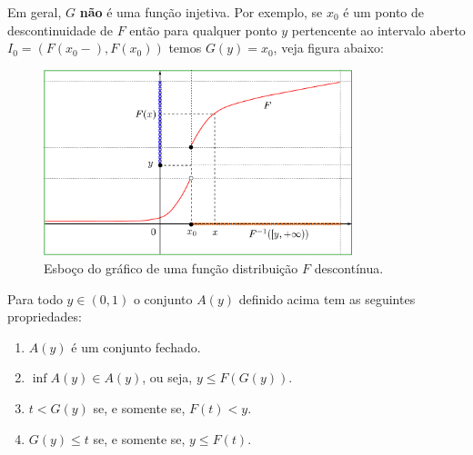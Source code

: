 \begin{observacao}
Em geral, $G$ {\bf não} é uma função injetiva. 
Por exemplo, se 
$x_0$ é um ponto de descontinuidade de $F$ então 
para qualquer ponto $y$ pertencente ao 
intervalo aberto $I_0=(F(x_0-),F(x_0))$ temos  
$G(y)=x_0$, veja figura abaixo:
\begin{center}
\begin{figure}[!htb]
\centering
\includegraphics[width=0.8\textwidth]{Figuras/inversa-gen.pdf}
\caption{Esboço do gráfico de uma função distribuição $F$ descontínua.}
\label{Rotulo}
\end{figure}
\end{center}
\end{observacao}

\begin{proposicao}\label{prop-propriedades-G}
	Para todo $y\in (0,1)$ o conjunto $A(y)$ definido acima 
	tem as seguintes propriedades:
	\begin{enumerate}
		\item 
		$A(y)$ é um conjunto fechado.
		
		\item
		$\inf A(y) \in A(y)$, ou seja, $y\leq F(G(y))$.
		
		\item 
		$t<G(y)$ se, e somente se, $F(t)<y$.
		
		\item 
		$G(y)\leq t$ se, e somente se, $y\leq F(t)$.
	\end{enumerate}
\end{proposicao}


